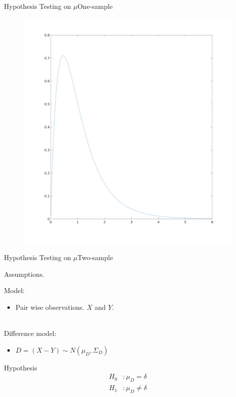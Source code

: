 \documentclass[aspectratio=169,10pt,t]{beamer}
\begin{document}
\begin{frame}{Hypothesis Testing on $\mu$}{One-sample}
	\begin{figure}[H]
		\centering
		\includegraphics[scale=0.15]{images/f.png}
	\end{figure} 
\end{frame}

\begin{frame}{Hypothesis Testing on $\mu$}{Two-sample}

	Assumptions.
	
	Model:
	\begin{itemize}
		\item Pair wise observations. $X$ and $Y$.
	\end{itemize}
	\\
	Difference model:
	\begin{itemize}
		\item 
			$ D =   \left( X - Y  \right)  \sim N \left( \mu_D, \Sigma_D  \right)  $
	\end{itemize}

	Hypothesis
	\begin{align*}
		H_0&: \mu_D = \delta\\
		H_1&: \mu_D \neq \delta
	\end{align*}

\end{frame}
\end{document}
